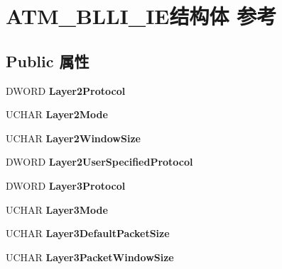 \hypertarget{struct_a_t_m___b_l_l_i___i_e}{}\section{A\+T\+M\+\_\+\+B\+L\+L\+I\+\_\+\+I\+E结构体 参考}
\label{struct_a_t_m___b_l_l_i___i_e}
\subsection*{Public 属性}
\begin{DoxyCompactItemize}
\item 
\mbox{\label{struct_a_t_m___b_l_l_i___i_e_afeea638a47d16b2a070ae138e85925f2}} 
D\+W\+O\+RD {\bfseries Layer2\+Protocol}
\item 
\mbox{\label{struct_a_t_m___b_l_l_i___i_e_ab238034b97f5fc8f77a79f434832ac8f}} 
U\+C\+H\+AR {\bfseries Layer2\+Mode}
\item 
\mbox{\label{struct_a_t_m___b_l_l_i___i_e_af3cbd90766dc66f6b8a95a6a25cb1b05}} 
U\+C\+H\+AR {\bfseries Layer2\+Window\+Size}
\item 
\mbox{\label{struct_a_t_m___b_l_l_i___i_e_aaf57a8c5c008e80a08c946b6611c31dd}} 
D\+W\+O\+RD {\bfseries Layer2\+User\+Specified\+Protocol}
\item 
\mbox{\label{struct_a_t_m___b_l_l_i___i_e_ac9eb189751f383009a4378e790f0d6b8}} 
D\+W\+O\+RD {\bfseries Layer3\+Protocol}
\item 
\mbox{\label{struct_a_t_m___b_l_l_i___i_e_a5c1979c32818026e98da437c81b0e102}} 
U\+C\+H\+AR {\bfseries Layer3\+Mode}
\item 
\mbox{\label{struct_a_t_m___b_l_l_i___i_e_a7ce8d4d29128425c903ded1ab96a1de6}} 
U\+C\+H\+AR {\bfseries Layer3\+Default\+Packet\+Size}
\item 
\mbox{\label{struct_a_t_m___b_l_l_i___i_e_a45623f66b2ddc27f3b5131a7855e69a8}} 
U\+C\+H\+AR {\bfseries Layer3\+Packet\+Window\+Size}

\end{DoxyCompactItemize}

